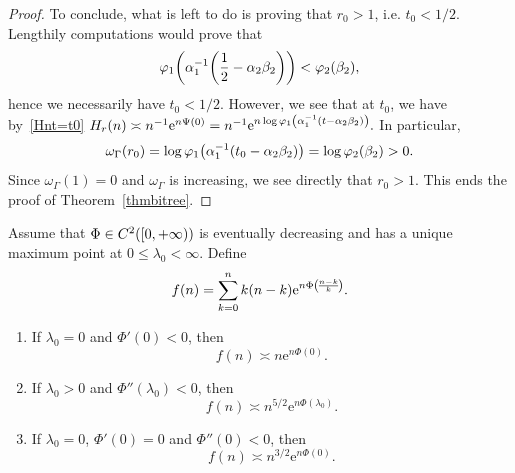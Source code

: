 \documentclass[AHL,Unicode,longabstracts]{cedram}
\newcommand{\rme}{\mathrm{e}}
\let\originalleft\left
\let\originalright\right
\renewcommand{\left}{\mathopen{}\mathclose\bgroup\originalleft}
\renewcommand{\right}{\aftergroup\egroup\originalright}
\let\oldin\in
\renewcommand{\in}{\mathchoice{\oldin}{\oldin}{\,\oldin\,}{\,\oldin\,}}
\newcommand*{\relabel}{\renewcommand{\labelenumi}{(\theenumi)}}
\newcommand*{\romanenumi}{\renewcommand*{\theenumi}{\roman{enumi}}\relabel}
\begin{document}
\begin{proof}
To conclude, what is left to do is proving that $r_0>1$, i.e. $t_0<1/2$. Lengthily computations would prove that
\[
\varphi_1 \left(\alpha_1^{-1} \left(\frac{1}{2} - \alpha_2 \beta_2 \right) \right) < \varphi_2(\beta_2),
\]
hence we necessarily have $t_0<1/2$.
However, we see that at $t_0$, we have by~\eqref{Hnt=t0} $ H_r(n) \asymp n^{-1} \rme^{n \Psi(0)} = n^{-1} \rme^{n \log \varphi_1 \left(\alpha_1^{-1} \left(t - \alpha_2 \beta_2 \right) \right)}. $ In particular,
\[
\omega_\Gamma(r_0)=\log \varphi_1 \left(\alpha_1^{-1} \left(t_0 - \alpha_2 \beta_2 \right) \right)=\log \varphi_2(\beta_2)>0.
\]
Since $\omega_\Gamma(1)=0$ and $\omega_\Gamma$ is increasing, we see directly that $r_0>1$. This ends the proof of Theorem~\ref{thmbitree}. \end{proof}



\begin{lemm}\label{asymptotics}
Assume that $\Phi \in C^2 \left([0, +\infty) \right)$ is eventually decreasing and has a unique maximum point at $0 \leq \lambda_0 < \infty$. Define
\[
f(n) = \sum_{k = 0}^n k (n - k) \rme^{n \Phi \left(\!\frac{n - k}{k}\!\right)}.
\]
\begin{enumerate}\romanenumi
\item\label{lemm3.3.1} If $\lambda_0 = 0$ and $\Phi'(0) < 0$, then
\[
f(n) \asymp n \rme^{n \Phi(0)}.
\]
\item\label{lemm3.3.2} If $\lambda_0 > 0$ and $\Phi''(\lambda_0) < 0$, then
\[
f(n) \asymp n^{5/2} \rme^{n \Phi(\lambda_0)}.
\]
\item\label{lemm3.3.3} If $\lambda_0 = 0$, $\Phi'(0) = 0$ and $\Phi''(0) < 0$, then
\[
f(n) \asymp n^{3/2} \rme^{n \Phi(0)}.
\]
\end{enumerate}
\end{lemm}
\end{document}

